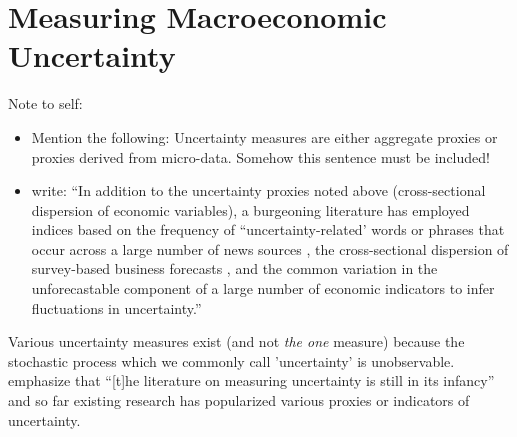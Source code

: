 \documentclass[a4paper,11pt,listof=nochaptergap,oneside,pointednumbers,bibtotoc,bigheadings,liststotoc]{scrbook}
\begin{document}
\section{Measuring Macroeconomic Uncertainty}
\label{sec:MeasuringUncertainty}
\begingroup
    \fontsize{8pt}{12pt}\selectfont
    Note to self:
\begin{itemize}
	\item  Mention the following: Uncertainty measures are either aggregate proxies or proxies derived from micro-data. Somehow this sentence must be included! 
	\item \citet{gilchristetal:14} write: ``In addition to the uncertainty proxies noted above (cross-sectional dispersion of economic variables), a burgeoning literature has employed indices based on the frequency of ``uncertainty-related' words or phrases that occur across a large number of news sources \citep{bakeretal:15}, the cross-sectional dispersion of survey-based business forecasts \citep{bachmannetal:13}, and the common variation in the unforecastable component of a large number of economic indicators \citep{juradoetal:15} to infer fluctuations in uncertainty.''
\end{itemize}
\endgroup


Various uncertainty measures exist (and not \textit{the one} measure) because the stochastic process which we commonly call 'uncertainty' is unobservable. \citet[p. 1182]{juradoetal:15} emphasize that ``[t]he literature on measuring uncertainty is still in its infancy'' and so far existing research has popularized various proxies or indicators of uncertainty.
\end{document}
